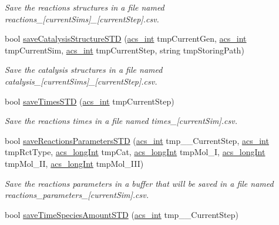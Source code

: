 \begin{DoxyCompactItemize}
\begin{DoxyCompactList}\small\item\em Save the reactions structures in a file named reactions\-\_\-\mbox{[}current\-Sims\mbox{]}\-\_\-\mbox{[}current\-Step\mbox{]}.csv. \end{DoxyCompactList}\item 
bool \hyperlink{a00003_a0a799b3a42bd90845a915298e184708c}{save\-Catalysis\-Structure\-S\-T\-D} (\hyperlink{a00016_a8d277355641a098190360234e2ebde35}{acs\-\_\-int} tmp\-Current\-Gen, \hyperlink{a00016_a8d277355641a098190360234e2ebde35}{acs\-\_\-int} tmp\-Current\-Sim, \hyperlink{a00016_a8d277355641a098190360234e2ebde35}{acs\-\_\-int} tmp\-Current\-Step, string tmp\-Storing\-Path)
\begin{DoxyCompactList}\small\item\em Save the catalysis structures in a file named catalysis\-\_\-\mbox{[}current\-Sims\mbox{]}\-\_\-\mbox{[}current\-Step\mbox{]}.csv. \end{DoxyCompactList}\item 
bool \hyperlink{a00003_af8083321a2bc93f4f613b05d74d37833}{save\-Times\-S\-T\-D} (\hyperlink{a00016_a8d277355641a098190360234e2ebde35}{acs\-\_\-int} tmp\-Current\-Step)
\begin{DoxyCompactList}\small\item\em Save the reactions times in a file named times\-\_\-\mbox{[}current\-Sim\mbox{]}.csv. \end{DoxyCompactList}\item 
bool \hyperlink{a00003_ae342684050eb7b52144015d258133098}{save\-Reactions\-Parameters\-S\-T\-D} (\hyperlink{a00016_a8d277355641a098190360234e2ebde35}{acs\-\_\-int} tmp\-\_\-\-\_\-\-Current\-Step, \hyperlink{a00016_a8d277355641a098190360234e2ebde35}{acs\-\_\-int} tmp\-Rct\-Type, \hyperlink{a00016_a19319d75f02db4308bc5c0026d98cd85}{acs\-\_\-long\-Int} tmp\-Cat, \hyperlink{a00016_a19319d75f02db4308bc5c0026d98cd85}{acs\-\_\-long\-Int} tmp\-Mol\-\_\-\-I, \hyperlink{a00016_a19319d75f02db4308bc5c0026d98cd85}{acs\-\_\-long\-Int} tmp\-Mol\-\_\-\-I\-I, \hyperlink{a00016_a19319d75f02db4308bc5c0026d98cd85}{acs\-\_\-long\-Int} tmp\-Mol\-\_\-\-I\-I\-I)
\begin{DoxyCompactList}\small\item\em Save the reactions parameters in a buffer that will be saved in a file named reactions\-\_\-parameters\-\_\-\mbox{[}current\-Sim\mbox{]}.csv. \end{DoxyCompactList}\item 
bool \hyperlink{a00003_a65c52d6a1b463c1123bdb62cba9fd088}{save\-Time\-Species\-Amount\-S\-T\-D} (\hyperlink{a00016_a8d277355641a098190360234e2ebde35}{acs\-\_\-int} tmp\-\_\-\-\_\-\-Current\-Step)

\end{DoxyCompactItemize}
